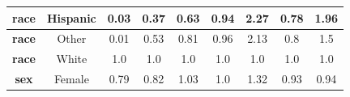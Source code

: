 \documentclass[oneside,openright,titlepage,numbers=noenddot,openany,headinclude,footinclude=true,
cleardoublepage=empty,abstractoff,BCOR=5mm,paper=a4,fontsize=12pt,main=spanish]{scrreprt}
\begin{document}
\begin{table}[H]
{\begin{tabular}{|c|c|c|c|c|c|c|c|c|}
\textbf{race}                                                     & Hispanic                                                           & {\color[HTML]{FE0000} 0.03}                                      & {\color[HTML]{FE0000} 0.37}                                      & {\color[HTML]{FE0000} 0.63}                                      & {\color[HTML]{32CB00} 0.94}                                      & {\color[HTML]{FE0000} 2.27}                                      & {\color[HTML]{FE0000} 0.78}                                      & {\color[HTML]{FE0000} 1.96}                                      \\ \hline
\textbf{race}                                                     & Other                                                              & {\color[HTML]{FE0000} 0.01}                                      & {\color[HTML]{FE0000} 0.53}                                      & {\color[HTML]{32CB00} 0.81}                                      & {\color[HTML]{32CB00} 0.96}                                      & {\color[HTML]{FE0000} 2.13}                                      & {\color[HTML]{32CB00} 0.8}                                       & {\color[HTML]{FE0000} 1.5}                                       \\ \hline
\textbf{race}                                                     & White                                                              & {\color[HTML]{3166FF} 1.0}                                       & {\color[HTML]{3166FF} 1.0}                                       & {\color[HTML]{3166FF} 1.0}                                       & {\color[HTML]{3166FF} 1.0}                                       & {\color[HTML]{3166FF} 1.0}                                       & {\color[HTML]{3166FF} 1.0}                                       & {\color[HTML]{3166FF} 1.0}                                       \\ \hline
\textbf{sex}                                                      & Female                                                             & {\color[HTML]{FE0000} 0.79}                                      & {\color[HTML]{32CB00} 0.82}                                      & {\color[HTML]{32CB00} 1.03}                                      & {\color[HTML]{32CB00} 1.0}                                       & {\color[HTML]{FE0000} 1.32}                                      & {\color[HTML]{32CB00} 0.93}                                      & {\color[HTML]{32CB00} 0.94}                                      \\ \hline

\end{tabular}}
\end{table}
\end{document}
